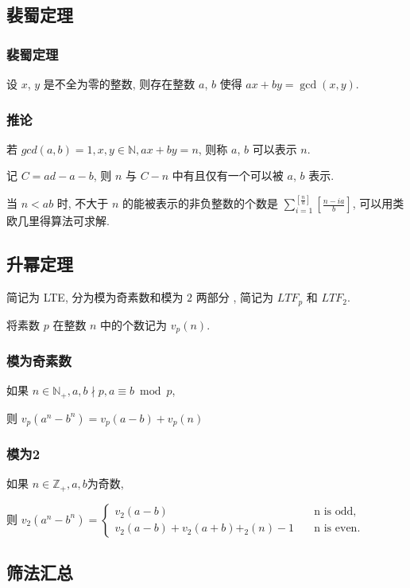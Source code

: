 \documentclass[UTF8, a4paper, titlepage, twoside]{ctexart}
\begin{document}
\subsection{ 裴蜀定理 }
\subsubsection{ 裴蜀定理 }
设 $x$, $y$ 是不全为零的整数, 则存在整数 $a$, $b$ 使得 $ax+by = \gcd(x, y)$.
\subsubsection{ 推论 }
若 $gcd(a, b) = 1, x, y \in \mathbb{N}, ax + by = n$, 则称 $a$, $b$ 可以表示 $n$.  

记 $C = ad - a - b$, 则 $n$ 与 $C - n$ 中有且仅有一个可以被 $a$, $b$ 表示. 

当 $n < ab$ 时, 不大于 $n$ 的能被表示的非负整数的个数是 $\sum\limits_{i = 1}^{\left[\frac{n}{a}\right]}\left[\frac{n-ia}{b}\right]$, 可以用类欧几里得算法可求解.

\subsection{ 升幂定理 }
简记为 LTE, 分为模为奇素数和模为 $2$ 两部分 , 简记为 $LTF_p$ 和 $LTF_2$. 

将素数 $p$ 在整数 $n$ 中的个数记为 $v_p(n)$. 
\subsubsection{ 模为奇素数 }
如果 $n \in \mathbb{N}_{+}, a, b \nmid p, a \equiv b\bmod p$,

则 $v_{p}\left(a^{n}-b^{n}\right)=v_{p}(a-b)+v_{p}(n)$

\subsubsection{ 模为2 }
如果 $n\in\mathbb{Z_+}, a, b$​ 为奇数,

则 $v_{2}\left(a^{n}-b^{n}\right)=
\left\{\begin{array}{rl}
v_{2}(a-b) \quad &\text {n is odd, } \\ 
v_{2}(a-b)+v_{2}(a+b)+_{2}(n) - 1 \quad &\text {n is even.} 
\end{array}\right.
$

\subsection{ 筛法汇总 }
\end{document}
